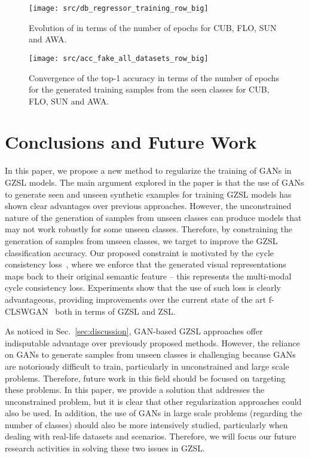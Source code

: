 \documentclass[runningheads]{llncs}
\begin{document}
\begin{figure}[t]
\centering
\texttt{[image: src/db\_regressor\_training\_row\_big]}
\caption{Evolution of  in terms of the number of epochs for CUB, FLO, SUN and AWA.}
\label{fig:sun_regressor}
\end{figure}

\begin{figure}[t]
\centering
	\texttt{[image: src/acc\_fake\_all\_datasets\_row\_big]}
 	\caption{Convergence of the top-1 accuracy in terms of the number of epochs for the generated training samples from the seen classes for CUB, FLO, SUN and AWA.}
    \label{fig:fake_acc}
\end{figure}



\section{Conclusions and Future Work}

In this paper, we propose a new method to regularize the training of GANs in GZSL models.  The main argument explored in the paper is that the use of GANs to generate seen and unseen synthetic examples for training GZSL models has shown clear advantages over previous approaches.  However, the unconstrained nature of the generation of samples from unseen classes can produce models that may not work robustly for some unseen classes.  Therefore, by constraining the generation of samples from unseen classes, we target to improve the GZSL classification accuracy.  Our proposed constraint is motivated by the cycle consistency loss~\cite{CycleGAN2017}, where we enforce that the generated visual representations maps back to their original semantic feature -- this represents the multi-modal cycle consistency loss.
Experiments show that the use of such loss is clearly advantageous, providing improvements over the current state of the art f-CLSWGAN~\cite{XianCVPR2018} both in terms of GZSL and ZSL.

As noticed in Sec.~\ref{sec:discussion}, GAN-based GZSL approaches offer indisputable advantage over previously proposed methods.  However, the reliance on GANs to generate samples from unseen classes is challenging because GANs are notoriously difficult to train, particularly in unconstrained and large scale problems.  Therefore, future work in this field should be focused on targeting these problems.  In this paper, we provide a solution that addresses the unconstrained problem, but it is clear that other regularization approaches could also be used.  In addition, the use of GANs in large scale problems (regarding the number of classes) should also be more intensively studied, particularly when dealing with real-life datasets and scenarios.  Therefore, we will focus our future research activities in solving these two issues in GZSL.




\end{document}
